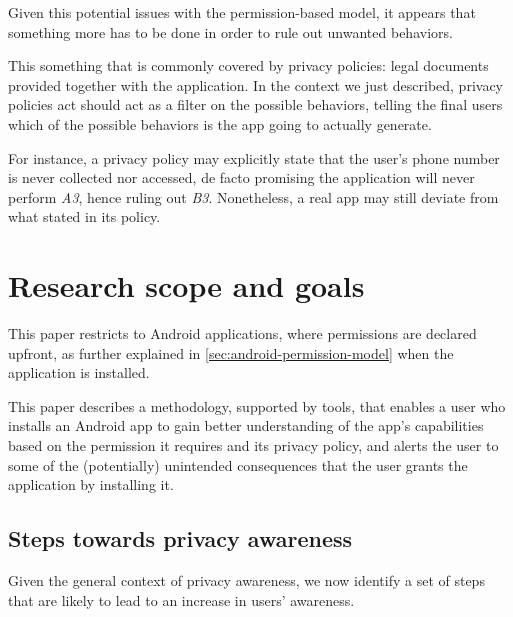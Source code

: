 \documentclass[twoside,letterpaper]{soups}
\theoremstyle{definition}
\begin{document}
Given this potential issues with the permission-based model, it appears that something more has to be done in order to rule out unwanted behaviors.

This something that is commonly covered by privacy policies: legal documents provided together with the application. In the context we just described, privacy policies act should act as a filter on the possible behaviors, telling the final users which of the possible behaviors is the app going to actually generate.

For instance, a privacy policy may explicitly state that the user's phone number is never collected nor accessed, de facto promising the application will never perform \emph{A3}, hence ruling out \emph{B3}. Nonetheless, a real app may still deviate from what stated in its policy.

\section{Research scope and goals}
This paper restricts to Android applications, where permissions are declared upfront, as further explained in \autoref{sec:android-permission-model} when the application is installed.

This paper describes a methodology, supported by tools, that enables a user who installs an Android app to gain better understanding of the app's capabilities based on the permission it requires and its privacy policy, and alerts the user to some of the (potentially) unintended consequences that the user grants the application by installing it.

\subsection{Steps towards privacy awareness}
Given the general context of privacy awareness, we now identify a set of steps that are likely to lead to an increase in users' awareness.
\end{document}
